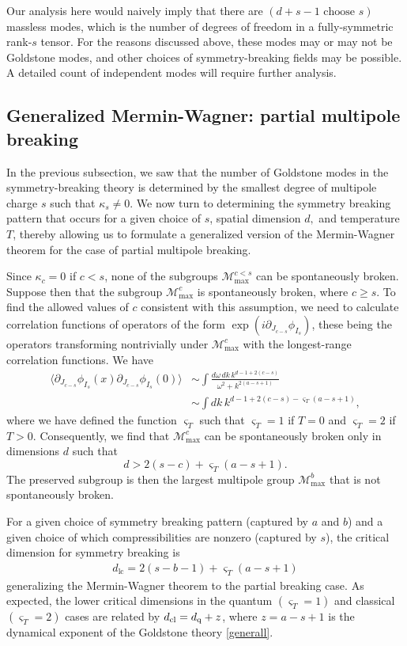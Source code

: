 \documentclass[prb,aps,twocolumn, amsfonts,amsmath,amssymb,nofootinbib,superscriptaddress]{revtex4-2}
\renewcommand{\max}{\text{max}}
\newcommand{\mmax}[1]{\mathcal{M}^{#1}_\max}
\newcommand\be            {\begin{equation}}
\newcommand\ee            {\end{equation}}
\newcommand\ba            {\begin{aligned}}
\newcommand\ea            {\end{aligned}}
\newcommand{\p}{\partial}
\begin{document}
Our analysis here would naively imply that there are $(d+s-1 \text{ choose } s)$ massless modes, which is the number of degrees of freedom in a fully-symmetric rank-$s$ tensor. For the reasons discussed above, these modes may or may not be Goldstone modes, and other choices of symmetry-breaking fields may be possible. A detailed count of independent modes will require further analysis.

\subsection{Generalized Mermin-Wagner: partial multipole breaking} \label{sub:partial}

In the previous subsection, we saw that the number of Goldstone modes in the symmetry-breaking theory is determined by the smallest degree of multipole charge $s$ such that $\kappa_s\neq0$. We now turn to determining the symmetry breaking pattern that occurs for a given choice of $s$, spatial dimension $d,$ and temperature $T$, thereby allowing us to formulate a generalized version of the Mermin-Wagner theorem for the case of partial multipole breaking. 

Since $\kappa_c=0$ if $c<s$, none of the subgroups $\mmax {c<s}$ can be spontaneously broken. Suppose then that the subgroup $\mmax{c}$ is spontaneously broken, where $c\geq s$. To find the allowed values of $c$ consistent with this assumption, we need to calculate correlation functions of operators of the form $\exp(i\p_{J_{c-s}}\phi_{I_s})$, these being the operators transforming nontrivially under $\mmax c$ with the longest-range correlation functions. We have 
\be\ba \langle \p_{J_{c-s}}\phi_{I_s}(x) \p_{J_{c-s}}\phi_{I_s}(0)\rangle & \sim \int \frac{d\omega \, dk\, k^{d-1+2(c-s)}}{\omega^2 + k^{2(a-s+1)}} \\ 
& \sim \int dk\, k^{d-1+2(c-s) - \varsigma_T(a-s+1)}, \ea\ee 
where we have defined the function $\varsigma_T$ such that $\varsigma_T = 1$ if $T=0$ and $\varsigma_T = 2$ if $T>0$. Consequently, we find that $\mmax c$ can be spontaneously broken only in dimensions $d$ such that 
\be d>2(s-c) + \varsigma_T(a-s+1).\ee 
The preserved subgroup is then the largest multipole group $\mmax{b}$ that is not spontaneously broken.

For a given choice of symmetry breaking pattern (captured by $a$ and $b$) and a given choice of which compressibilities are nonzero (captured by $s$), the critical dimension for symmetry breaking is
\begin{align}
d_\text{lc} = 2(s - b-1) + \varsigma_T (a-s+1) \label{pbreak_mw} 
\end{align}
generalizing the Mermin-Wagner theorem to the partial breaking case. 
As expected, the lower critical dimensions in the quantum $(\varsigma_T = 1)$ and classical $(\varsigma_T = 2)$ cases are related by $d_{\rm cl} = d_{\rm q} + z$, where $z=a-s+1$ is the dynamical exponent of the Goldstone theory \eqref{generall}. 
\end{document}
